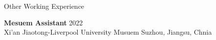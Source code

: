 \documentclass[
	11pt, %
]{resume} %
\begin{document}

\begin{rSection}{Other Working Experience}
	
    \textbf{Mesuem Assistant} \hfill 2022 \\ 
    Xi'an Jiaotong-Liverpool University Musuem  \hfill Suzhou, Jiangsu, Chnia \\


    
\end{rSection}
\end{document}
